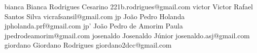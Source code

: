     {bianca}
    {Bianca Rodrigues Cesarino}
    {221b.rodrigues@gmail.com}
    {victor}
    {Victor Rafael Santos Silva}
    {vicrafsansil@gmail.com}
    {jp}
    {João Pedro Holanda}
    {jpholanda.prf@gmail.com}
    {jp'}
    {João Pedro de Amorim Paula}
    {jpedrodeamorim@gmail.com}
    {josenaldo}
    {Josenaldo Júnior}
    {josenaldo.asj@gmail.com}
    {giordano}
    {Giordano Rodrigues}
    {giordano2dcc@gmail.com}
